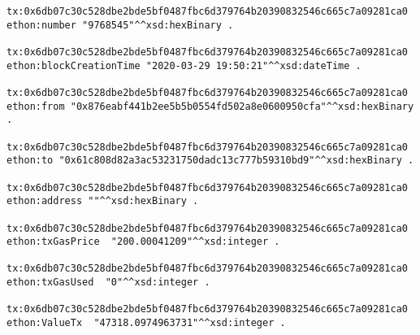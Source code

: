 \begin{lstlisting}
tx:0x6db07c30c528dbe2bde5bf0487fbc6d379764b20390832546c665c7a09281ca0  ethon:number "9768545"^^xsd:hexBinary .

tx:0x6db07c30c528dbe2bde5bf0487fbc6d379764b20390832546c665c7a09281ca0  ethon:blockCreationTime "2020-03-29 19:50:21"^^xsd:dateTime .

tx:0x6db07c30c528dbe2bde5bf0487fbc6d379764b20390832546c665c7a09281ca0  ethon:from "0x876eabf441b2ee5b5b0554fd502a8e0600950cfa"^^xsd:hexBinary .

tx:0x6db07c30c528dbe2bde5bf0487fbc6d379764b20390832546c665c7a09281ca0  ethon:to "0x61c808d82a3ac53231750dadc13c777b59310bd9"^^xsd:hexBinary .

tx:0x6db07c30c528dbe2bde5bf0487fbc6d379764b20390832546c665c7a09281ca0  ethon:address ""^^xsd:hexBinary .

tx:0x6db07c30c528dbe2bde5bf0487fbc6d379764b20390832546c665c7a09281ca0  ethon:txGasPrice  "200.00041209"^^xsd:integer .

tx:0x6db07c30c528dbe2bde5bf0487fbc6d379764b20390832546c665c7a09281ca0  ethon:txGasUsed  "0"^^xsd:integer .

tx:0x6db07c30c528dbe2bde5bf0487fbc6d379764b20390832546c665c7a09281ca0  ethon:ValueTx  "47318.0974963731"^^xsd:integer .








\end{lstlisting}



